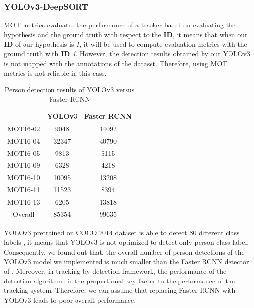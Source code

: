 \subsubsection{YOLOv3-DeepSORT}

\hspace{0.45cm}MOT metrics\cite{Milan2016MOT16AB} evaluates the performance of a tracker based on evaluating the hypothesis and the ground truth with respect to the \textbf{ID}, it means that
when our \textbf{ID} of our hypothesis is \textit{1}, it will be used to compute evaluation metrics with the ground truth with \textbf{ID} \textit{1}. However, the detection results obtained
by our YOLOv3 is not mapped with the annotations of the dataset. Therefore, using MOT metrics \cite{Milan2016MOT16AB} is not reliable in this case.\par 

\begin{table}[H]
\begin{center}
    \begin{tabular}{|| c | c | c ||} 
    \hline
    & YOLOv3\cite{yolov3} & Faster \acrshort{RCNN} \cite{Wojke2017simple}  \\
    \hline
    \hline
    MOT16-02 & 9048 & 14092\\
    \hline
    MOT16-04 & 32347 & 40790\\
    \hline
    MOT16-05 & 9813 & 5115 \\
    \hline
    MOT16-09 & 6328 & 4218 \\
    \hline
    MOT16-10 & 10095 & 13208\\
    \hline
    MOT16-11 & 11523 & 8394\\
    \hline
    MOT16-13 & 6205 & 13818\\
    \hline
    Overall & 85354 & 99635 \\
    \hline

\end{tabular}
\end{center}
    \caption{Person detection results of YOLOv3\cite{yolov3} versus Faster \acrshort{RCNN}}
    \label{tab:detections_results}
\end{table}

YOLOv3 pretrained on COCO 2014 dataset is able to detect 80 different class labels \cite{yolov3}, it means that YOLOv3 is not optimized to detect only person class label. Consequently, 
we found out that, the overall number of person detections of the YOLOv3\cite{yolov3} model we implemented is much smaller than the Faster \acrshort{RCNN} detector of \cite{Wojke2017simple}. Moreover, 
in tracking-by-detection framework, the performance of the detection algorithms is the proportional key factor to the performance of the tracking system. Therefore,
we can assume that replacing Faster \acrshort{RCNN} with YOLOv3\cite{yolov3} leads to poor overall performance.

